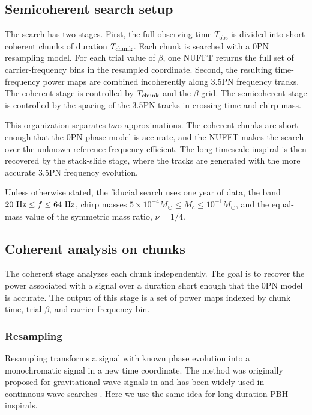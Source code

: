 \documentclass[aps,prd,amsmath,floats,floatfix, twocolumn,
superscriptaddress,nofootinbib,showpacs]{revtex4-2}
\newcommand{\Tobs}{T_\text{obs}}
\begin{document}
\subsection{Semicoherent search setup}
\label{sec:semicoherent_setup}
The search has two stages.  First, the full observing time $\Tobs$ is divided
into short coherent chunks of duration $T_{\rm chunk}$.  Each chunk is searched
with a 0PN resampling model.  For each trial value of $\beta$, one NUFFT returns
the full set of carrier-frequency bins in the resampled coordinate.  Second,
the resulting time-frequency power maps are combined incoherently along 3.5PN
frequency tracks.  The coherent stage is controlled by $T_{\rm chunk}$ and the
$\beta$ grid.  The semicoherent stage is controlled by the spacing of the 3.5PN
tracks in crossing time and chirp mass.

This organization separates two approximations.  The coherent chunks are short
enough that the 0PN phase model is accurate, and the NUFFT makes the search
over the unknown reference frequency efficient.  The long-timescale inspiral is
then recovered by the stack-slide stage, where the tracks are generated with
the more accurate 3.5PN frequency evolution.

Unless otherwise stated, the fiducial search uses one year of data, the band
$20~{\rm Hz}\leq f \leq 64~{\rm Hz}$, chirp masses
$5\times10^{-4}M_\odot \leq M_c \leq 10^{-1}M_\odot$, and the equal-mass value
of the symmetric mass ratio, $\nu=1/4$.


\subsection{Coherent analysis on chunks}
\label{sec:parameter_space}
The coherent stage analyzes each chunk independently.  The goal is to recover
the power associated with a signal over a duration short enough that the 0PN
model is accurate.  The output of this stage is a set of power maps indexed by
chunk time, trial $\beta$, and carrier-frequency bin.

\subsubsection{Resampling}
\label{sec:resampling}
Resampling transforms a signal with known phase evolution into a monochromatic
signal in a new time coordinate.  The method was originally proposed for
gravitational-wave signals in \cite{Smith:1987hh} and has been widely used in
continuous-wave searches \cite{livasBroadbandSearchTechniques1989,
Jaranowski:1998qm, Astone:2010ct, Singhal:2019dfn}.  Here we use the same idea
for long-duration PBH inspirals.
\end{document}

